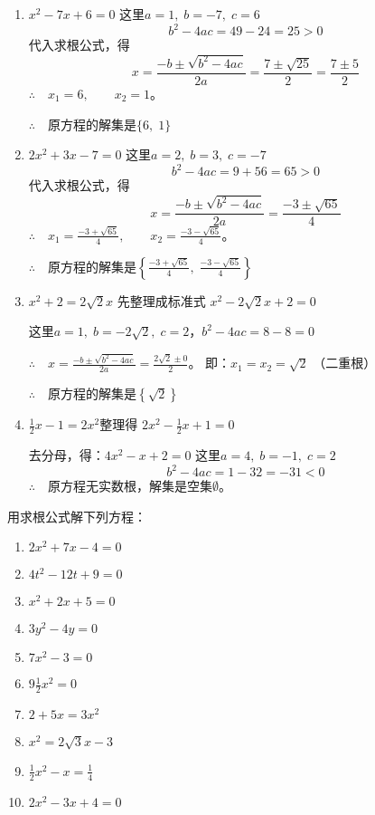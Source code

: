 \begin{solution}
\begin{enumerate}
    \item  $x^2-7x+6=0$ 这里$a=1,\; b=-7,\; c=6$
\[b^2-4ac=49-24=25>0\]
代入求根公式，得
\[x=\frac{-b\pm\sqrt{b^2-4ac}}{2a}=\frac{7\pm\sqrt{25}}{2}=\frac{7\pm 5}{2} \]
$\therefore\quad x_1=6,\qquad x_2=1$。

$\therefore\quad $原方程的解集是$\{6,\; 1\}$

\item $2x^2+3x-7=0$ 这里$a=2,\; b=3,\; c=-7$
\[b^2-4ac=9+56=65>0\]
代入求根公式，得
\[x=\frac{-b\pm\sqrt{b^2-4ac}}{2a}=\frac{-3\pm\sqrt{65}}{4} \]
$\therefore\quad x_1=\frac{-3+\sqrt{65}}{4},\qquad x_2=\frac{-3-\sqrt{65}}{4}$。

$\therefore\quad $原方程的解集是$\left\{\frac{-3+\sqrt{65}}{4},\; \frac{-3-\sqrt{65}}{4}\right\}$

\item $x^2+2=2\sqrt{2}x$ 先整理成标准式 $x^2-2\sqrt{2}x+2=0$

这里$a=1,\; b=-2\sqrt{2},\; c=2$，$b^2-4ac=8-8=0$

$\therefore\quad x=\frac{-b\pm\sqrt{b^2-4ac}}{2a}=\frac{2\sqrt{2}\pm 0}{2}$。
即：$x_1=x_2=\sqrt{2}$ （二重根）

$\therefore\quad $原方程的解集是$\left\{\sqrt{2}\right\}$

\item $\frac{1}{2}x-1=2x^2$整理得  $2x^2-\frac{1}{2}x+1=0$

去分母，得：$4x^2-x+2=0$ 这里$a=4,\; b=-1,\; c=2$
\[b^2-4ac=1-32=-31<0\]
$\therefore\quad $原方程无实数根，解集是空集$\emptyset$。
\end{enumerate}    
\end{solution}

\begin{ex}
    用求根公式解下列方程：
    \begin{multicols}{2}
 \begin{enumerate}
    \item $2 x^{2}+7 x-4=0$
\item $4 t^{2}-12 t+9=0$
\item $x^{2}+2 x+5=0$
\item  $3 y^{2}-4 y=0$
\item  $7 x^{2}-3=0$
\item $9 \frac{1}{2} x^{2}=0$
\item  $2+5 x=3 x^{2}$
\item  $x^{2}=2 \sqrt{3} x-3$
\item  $\frac{1}{2} x^{2}-x=\frac{1}{4}$
\item $2 x^{2}-3 x+4=0$
\end{enumerate}       
    \end{multicols}

\end{ex}



